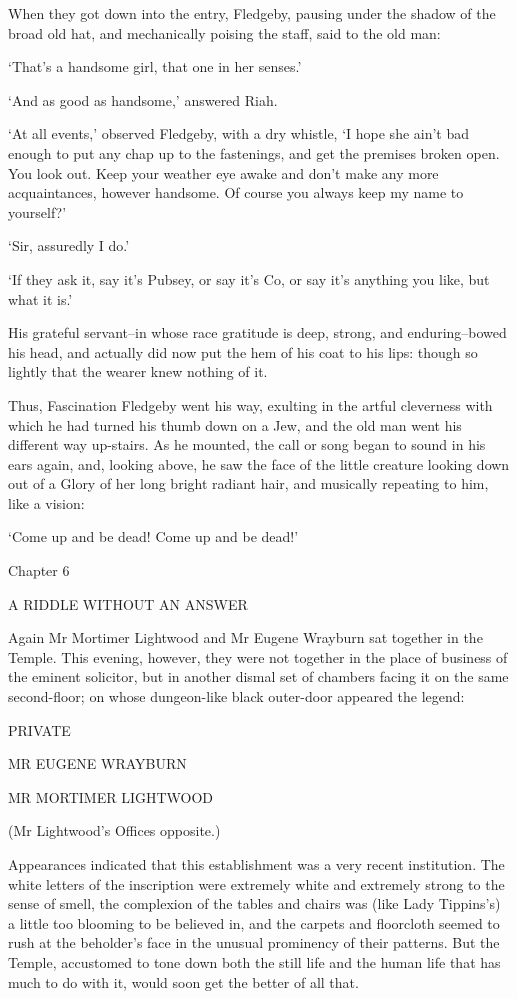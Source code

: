 When they got down into the entry, Fledgeby, pausing under the shadow of
the broad old hat, and mechanically poising the staff, said to the old
man:

‘That’s a handsome girl, that one in her senses.’

‘And as good as handsome,’ answered Riah.

‘At all events,’ observed Fledgeby, with a dry whistle, ‘I hope she
ain’t bad enough to put any chap up to the fastenings, and get the
premises broken open. You look out. Keep your weather eye awake and
don’t make any more acquaintances, however handsome. Of course you
always keep my name to yourself?’

‘Sir, assuredly I do.’

‘If they ask it, say it’s Pubsey, or say it’s Co, or say it’s anything
you like, but what it is.’

His grateful servant--in whose race gratitude is deep, strong, and
enduring--bowed his head, and actually did now put the hem of his coat
to his lips: though so lightly that the wearer knew nothing of it.

Thus, Fascination Fledgeby went his way, exulting in the artful
cleverness with which he had turned his thumb down on a Jew, and the old
man went his different way up-stairs. As he mounted, the call or song
began to sound in his ears again, and, looking above, he saw the face
of the little creature looking down out of a Glory of her long bright
radiant hair, and musically repeating to him, like a vision:

‘Come up and be dead! Come up and be dead!’



Chapter 6

A RIDDLE WITHOUT AN ANSWER


Again Mr Mortimer Lightwood and Mr Eugene Wrayburn sat together in the
Temple. This evening, however, they were not together in the place of
business of the eminent solicitor, but in another dismal set of
chambers facing it on the same second-floor; on whose dungeon-like black
outer-door appeared the legend:

		PRIVATE

		MR EUGENE WRAYBURN

		MR MORTIMER LIGHTWOOD

		(Mr Lightwood’s Offices opposite.)

Appearances indicated that this establishment was a very recent
institution. The white letters of the inscription were extremely white
and extremely strong to the sense of smell, the complexion of the
tables and chairs was (like Lady Tippins’s) a little too blooming to
be believed in, and the carpets and floorcloth seemed to rush at the
beholder’s face in the unusual prominency of their patterns. But the
Temple, accustomed to tone down both the still life and the human life
that has much to do with it, would soon get the better of all that.

